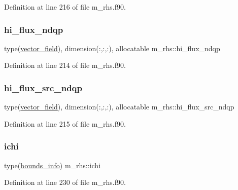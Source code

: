 Definition at line 216 of file m\+\_\+rhs.\+f90.

\mbox{\label{namespacem__rhs_af2fd928afcca77f0351ad57592dc53f4}} 
\subsubsection{\texorpdfstring{hi\+\_\+flux\+\_\+ndqp}{hi\_flux\_ndqp}}
{\footnotesize\ttfamily type(\hyperlink{structm__derived__types_1_1vector__field}{vector\+\_\+field}), dimension(\+:,\+:,\+:), allocatable m\+\_\+rhs\+::hi\+\_\+flux\+\_\+ndqp}



Definition at line 214 of file m\+\_\+rhs.\+f90.

\mbox{\label{namespacem__rhs_a41372eab4f40baf2501e543f406a1cab}} 
\subsubsection{\texorpdfstring{hi\+\_\+flux\+\_\+src\+\_\+ndqp}{hi\_flux\_src\_ndqp}}
{\footnotesize\ttfamily type(\hyperlink{structm__derived__types_1_1vector__field}{vector\+\_\+field}), dimension(\+:,\+:,\+:), allocatable m\+\_\+rhs\+::hi\+\_\+flux\+\_\+src\+\_\+ndqp}



Definition at line 215 of file m\+\_\+rhs.\+f90.

\mbox{\label{namespacem__rhs_ad2b935d288f68dbde65021da0498007d}} 
\subsubsection{\texorpdfstring{ichi}{ichi}}
{\footnotesize\ttfamily type(\hyperlink{structm__derived__types_1_1bounds__info}{bounds\+\_\+info}) m\+\_\+rhs\+::ichi}



Definition at line 230 of file m\+\_\+rhs.\+f90.


